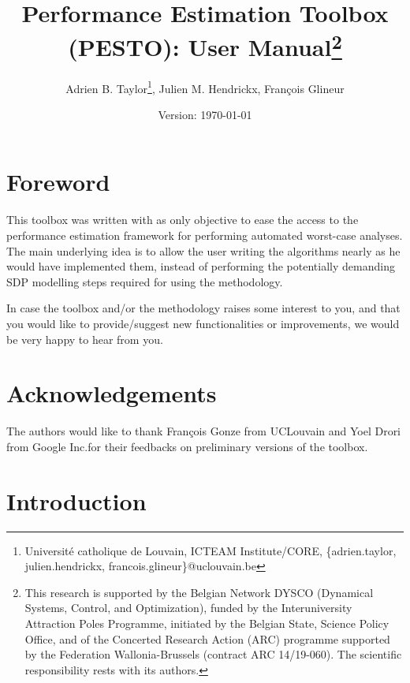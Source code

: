 \documentclass[11pt,a4paper]{article}
\begin{document}
\author{Adrien B. Taylor\footnote{Universit\'e catholique de Louvain, ICTEAM Institute/CORE, 
               \{adrien.taylor, julien.hendrickx, francois.glineur\}@uclouvain.be}, Julien M. Hendrickx\footnotemark[2], Fran\c{c}ois Glineur\footnotemark[2]}
\title{Performance Estimation Toolbox (PESTO): User Manual\thanks{This research is supported by the Belgian Network DYSCO (Dynamical Systems, Control, and Optimization), funded by the Interuniversity Attraction Poles Programme, initiated by the Belgian State, Science Policy Office, and of the Concerted Research Action (ARC) programme supported by the Federation Wallonia-Brussels (contract ARC 14/19-060). The scientific responsibility rests with its authors.}}
\date{Version: \today}
\maketitle

\renewcommand*\contentsname{}
\setcounter{tocdepth}{3} \tableofcontents


\section*{Foreword}
This toolbox was written with as only objective to ease the access to the performance estimation framework for performing automated worst-case analyses. The main underlying idea is to allow the user writing the algorithms nearly as he would have implemented them, instead of performing the potentially demanding SDP modelling steps required for using the methodology.


In case the toolbox and/or the methodology raises some interest to you, and that you would like to provide/suggest new functionalities or improvements, we would be very happy to hear from you.

\section*{Acknowledgements}
The authors would like to thank Fran\c{c}ois Gonze from UCLouvain and Yoel Drori from Google Inc.\@ for their feedbacks on preliminary versions of the toolbox.

\section{Introduction}			%
\end{document}
